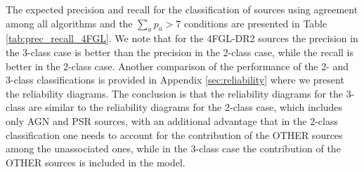The expected precision and recall for the classification of sources using agreement among all algorithms and the
$\sum_a p_a > 7$ conditions are presented in Table \ref{tab:prec_recall_4FGL}.
We note that for the 4FGL-DR2 sources the
precision in the 3-class case is better than the precision in the 2-class case, while the recall is better in the 2-class case.
Another comparison of the performance of the 2- and 3-class classifications is provided in Appendix \ref{sec:reliability} where we present the reliability diagrams.
The conclusion is that the reliability diagrams for the 3-class are similar to the reliability diagrams for the 2-class case, which includes only AGN and PSR sources, with an additional advantage that in the 2-class classification one needs to account for the contribution of the OTHER sources among the unassociated ones, while in the 3-class case the contribution of the OTHER sources is included in the model.

\begin{table}[!h]
    \caption{Testing accuracy of the four selected algorithms for the 3-class classification of 4FGL-DR2 sources.}
    \label{tab:selected_algs_4fgl_multi}

\centering
\hspace{-0.2cm}
\end{table}


